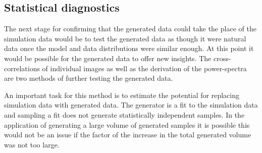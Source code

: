 \documentclass[twocolumn]{article}
\numberwithin{equation}{section}
\begin{document}

\subsection{Statistical diagnostics}

The next stage for confirming that the generated data could take the place of the simulation data would be to test the generated data as though it were natural data once the model and data distributions were similar enough. At this point it would be possible for the generated data to offer new insights. The cross-correlations of individual images as well as the derivation of the power-spectra are two methods of further testing the generated data.

An important task for this method is to estimate the potential for replacing simulation data with generated data. The generator is a fit to the simulation data and sampling a fit does not generate statistically independent samples. In the application of generating a large volume of generated samples it is possible this would not be an issue if the factor of the increase in the total generated volume was not too large.



\end{document}
